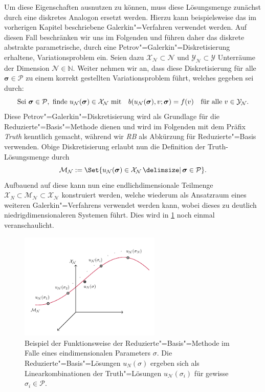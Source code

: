 \documentclass[../main.tex]{subfiles}
\begin{document}
Um diese Eigenschaften ausnutzen zu können, muss diese Lösungsmenge zunächst durch eine diskretes Analogon ersetzt werden.
Hierzu kann beispielsweise das im vorherigen Kapitel beschriebene Galerkin"=Verfahren verwendet werden.
Auf diesen Fall beschränken wir uns im Folgenden und führen daher das diskrete abstrakte parametrische, durch eine Petrov"=Galerkin"=Diskretisierung erhaltene, Variationsproblem ein.
Seien dazu $\mathcal X_{\mathcal N} \subset \mathcal N$ und $\mathcal Y_{\mathcal N} \subset \mathcal Y$ Unterräume der Dimension $\mathcal N \in \mathbb{N}$.
Weiter nehmen wir an, dass diese Diskretisierung für alle $\bm \sigma \in \mathcal P$ zu einem korrekt gestellten Variationsproblem führt, welches gegeben sei durch:
\begin{equation}
\label{eq:diskretes_abstraktes_parametrisches_vp}
    \text{Sei } \bm \sigma \in \mathcal P, \text{ finde } u_{\mathcal N}(\bm \sigma) \in \mathcal X_{\mathcal N} \text{ mit} \quad b(u_{\mathcal N}(\bm \sigma), v; \bm \sigma) = f(v) \quad \fa v \in \mathcal Y_{\mathcal N}.
\end{equation}
Diese Petrov"=Galerkin"=Diskretisierung wird als Grundlage für die Reduzierte"=Basis"=Methode dienen und wird im Folgenden mit dem Präfix \emph{Truth} kenntlich gemacht, während wir \emph{RB} als Abkürzung für Reduzierte"=Basis verwenden.
Obige Diskretisierung erlaubt nun die Definition der Truth-Lösungsmenge durch
\begin{equation}
\label{eq:truth_loesungsmenge}
    \mathcal M_{\mathcal N} := \Set{u_{\mathcal N}(\bm \sigma) \in \mathcal X_{\mathcal N} \given \bm \sigma \in \mathcal P}.
\end{equation}
Aufbauend auf diese kann nun eine endlichdimensionale Teilmenge $\mathcal X_{N} \subset \mathcal M_{\mathcal N} \subset \mathcal X_{\mathcal N}$ konstruiert werden, welche wiederum als Ansatzraum eines weiteren Galerkin"=Verfahrens verwendet werden kann,
wobei dieses zu deutlich niedrigdimensionaleren Systemen führt.
Dies wird in \cref{figure:rbm_loesungsmenge} noch einmal veranschaulicht.

\begin{figure}[tb]
    \centering
    \includegraphics[width=0.6\textwidth]{figures/rb.pdf}
    \caption[%
    Skizze zur Motivation der Reduzierte-Basis-Methode.
    ]{
        Beispiel der Funktionsweise der Reduzierte"=Basis"=Methode im Falle eines eindimensionalen Parameters $\sigma$.
        Die Reduzierte"=Basis"=Lösungen $u_{N}(\sigma)$ ergeben sich als Linearkombinationen der Truth"=Lösungen $u_{\mathcal N}(\sigma_{i})$ für gewisse $\sigma_{i} \in \mathcal P$.
        }
    \label{figure:rbm_loesungsmenge}
\end{figure}
\end{document}
